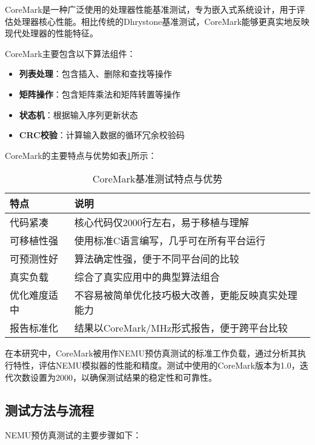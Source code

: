 \documentclass[bachelor]{thesis-uestc}
\begin{document}
CoreMark是一种广泛使用的处理器性能基准测试，专为嵌入式系统设计，用于评估处理器核心性能。相比传统的Dhrystone基准测试，CoreMark能够更真实地反映现代处理器的性能特征。

CoreMark主要包含以下算法组件：

\begin{itemize}
    \item \textbf{列表处理}：包含插入、删除和查找等操作
    \item \textbf{矩阵操作}：包含矩阵乘法和矩阵转置等操作
    \item \textbf{状态机}：根据输入序列更新状态
    \item \textbf{CRC校验}：计算输入数据的循环冗余校验码
\end{itemize}

CoreMark的主要特点与优势如表\ref{tab:coremark_features}所示：

\begin{table}[htbp]
\caption{CoreMark基准测试特点与优势}
\centering
\begin{tabular}{|p{3cm}|p{10cm}|}
\hline
\textbf{特点} & \textbf{说明} \\
\hline
代码紧凑 & 核心代码仅2000行左右，易于移植与理解 \\
\hline
可移植性强 & 使用标准C语言编写，几乎可在所有平台运行 \\
\hline
可预测性好 & 算法确定性强，便于不同平台间的比较 \\
\hline
真实负载 & 综合了真实应用中的典型算法组合 \\
\hline
优化难度适中 & 不容易被简单优化技巧极大改善，更能反映真实处理能力 \\
\hline
报告标准化 & 结果以CoreMark/MHz形式报告，便于跨平台比较 \\
\hline
\end{tabular}
\label{tab:coremark_features}
\end{table}

在本研究中，CoreMark被用作NEMU预仿真测试的标准工作负载，通过分析其执行特性，评估NEMU模拟器的性能和精度。测试中使用的CoreMark版本为1.0，迭代次数设置为2000，以确保测试结果的稳定性和可靠性。

\subsection{测试方法与流程}

NEMU预仿真测试的主要步骤如下：
\end{document}

